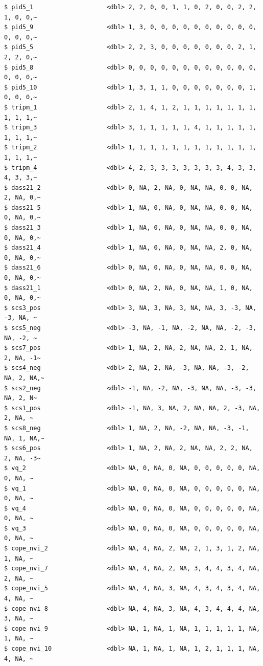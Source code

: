 \documentclass[
  11pt,
  a4paper,
  onecolumn]{article}
\begin{document}
\begin{verbatim}
$ pid5_1                    <dbl> 2, 2, 0, 0, 1, 1, 0, 2, 0, 0, 2, 2, 1, 0, 0,~
$ pid5_9                    <dbl> 1, 3, 0, 0, 0, 0, 0, 0, 0, 0, 0, 0, 0, 0, 0,~
$ pid5_5                    <dbl> 2, 2, 3, 0, 0, 0, 0, 0, 0, 0, 2, 1, 2, 2, 0,~
$ pid5_8                    <dbl> 0, 0, 0, 0, 0, 0, 0, 0, 0, 0, 0, 0, 0, 0, 0,~
$ pid5_10                   <dbl> 1, 3, 1, 1, 0, 0, 0, 0, 0, 0, 0, 1, 0, 0, 0,~
$ tripm_1                   <dbl> 2, 1, 4, 1, 2, 1, 1, 1, 1, 1, 1, 1, 1, 1, 1,~
$ tripm_3                   <dbl> 3, 1, 1, 1, 1, 1, 4, 1, 1, 1, 1, 1, 1, 1, 1,~
$ tripm_2                   <dbl> 1, 1, 1, 1, 1, 1, 1, 1, 1, 1, 1, 1, 1, 1, 1,~
$ tripm_4                   <dbl> 4, 2, 3, 3, 3, 3, 3, 3, 3, 4, 3, 3, 4, 3, 3,~
$ dass21_2                  <dbl> 0, NA, 2, NA, 0, NA, NA, 0, 0, NA, 2, NA, 0,~
$ dass21_5                  <dbl> 1, NA, 0, NA, 0, NA, NA, 0, 0, NA, 0, NA, 0,~
$ dass21_3                  <dbl> 1, NA, 0, NA, 0, NA, NA, 0, 0, NA, 0, NA, 0,~
$ dass21_4                  <dbl> 1, NA, 0, NA, 0, NA, NA, 2, 0, NA, 0, NA, 0,~
$ dass21_6                  <dbl> 0, NA, 0, NA, 0, NA, NA, 0, 0, NA, 0, NA, 0,~
$ dass21_1                  <dbl> 0, NA, 2, NA, 0, NA, NA, 1, 0, NA, 0, NA, 0,~
$ scs3_pos                  <dbl> 3, NA, 3, NA, 3, NA, NA, 3, -3, NA, -3, NA, ~
$ scs5_neg                  <dbl> -3, NA, -1, NA, -2, NA, NA, -2, -3, NA, -2, ~
$ scs7_pos                  <dbl> 1, NA, 2, NA, 2, NA, NA, 2, 1, NA, 2, NA, -1~
$ scs4_neg                  <dbl> 2, NA, 2, NA, -3, NA, NA, -3, -2, NA, 2, NA,~
$ scs2_neg                  <dbl> -1, NA, -2, NA, -3, NA, NA, -3, -3, NA, 2, N~
$ scs1_pos                  <dbl> -1, NA, 3, NA, 2, NA, NA, 2, -3, NA, 2, NA, ~
$ scs8_neg                  <dbl> 1, NA, 2, NA, -2, NA, NA, -3, -1, NA, 1, NA,~
$ scs6_pos                  <dbl> 1, NA, 2, NA, 2, NA, NA, 2, 2, NA, 2, NA, -3~
$ vq_2                      <dbl> NA, 0, NA, 0, NA, 0, 0, 0, 0, 0, NA, 0, NA, ~
$ vq_1                      <dbl> NA, 0, NA, 0, NA, 0, 0, 0, 0, 0, NA, 0, NA, ~
$ vq_4                      <dbl> NA, 0, NA, 0, NA, 0, 0, 0, 0, 0, NA, 0, NA, ~
$ vq_3                      <dbl> NA, 0, NA, 0, NA, 0, 0, 0, 0, 0, NA, 0, NA, ~
$ cope_nvi_2                <dbl> NA, 4, NA, 2, NA, 2, 1, 3, 1, 2, NA, 1, NA, ~
$ cope_nvi_7                <dbl> NA, 4, NA, 2, NA, 3, 4, 4, 3, 4, NA, 2, NA, ~
$ cope_nvi_5                <dbl> NA, 4, NA, 3, NA, 4, 3, 4, 3, 4, NA, 4, NA, ~
$ cope_nvi_8                <dbl> NA, 4, NA, 3, NA, 4, 3, 4, 4, 4, NA, 3, NA, ~
$ cope_nvi_9                <dbl> NA, 1, NA, 1, NA, 1, 1, 1, 1, 1, NA, 1, NA, ~
$ cope_nvi_10               <dbl> NA, 1, NA, 1, NA, 1, 2, 1, 1, 1, NA, 4, NA, ~

\end{verbatim}
\end{document}
